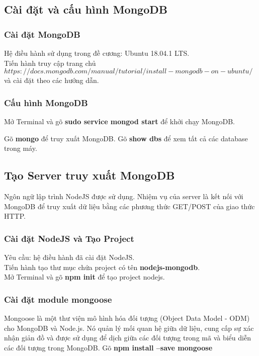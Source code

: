 \subsection{Cài đặt và cấu hình MongoDB}
\subsubsection{Cài đặt MongoDB}
Hệ điều hành sử dụng trong đề cương: Ubuntu 18.04.1 LTS.\\
Tiến hành truy cập trang chủ $https://docs.mongodb.com/manual/tutorial/install-mongodb-on-ubuntu/$ và cài đặt theo các hướng dẫn.
\label{ref{fig4_1}}
\subsubsection{Cấu hình MongoDB}
Mở Terminal và gõ \textbf{sudo service mongod start} để khởi chạy MongoDB.\\
\label{ref{fig4_2}}

Gõ \textbf{mongo} để truy xuất MongoDB.
\label{ref{fig4_3}}
Gõ \textbf{show dbs} để xem tất cả các database trong máy.
\label{ref{fig4_4}}

\subsection{Tạo Server truy xuất MongoDB}
Ngôn ngữ lập trình NodeJS được sử dụng. Nhiệm vụ của server là kết nối với MongoDB để truy xuất dữ liệu bằng các phương thức GET/POST của giao thức HTTP.

\subsubsection{Cài đặt NodeJS và Tạo Project}
Yêu cầu: hệ điều hành đã cài đặt NodeJS.\\
Tiến hành tạo thư mục chứa project có tên \textbf{nodejs-mongodb}.\\
Mở Terminal và gõ \textbf{npm init} để tạo project nodejs.\\
\label{ref{fig4_5}}

\subsubsection{Cài đặt module mongoose}
Mongoose là một thư viện mô hình hóa đối tượng (Object Data Model - ODM) cho MongoDB và Node.js. Nó quản lý mối quan hệ giữa dữ liệu, cung cấp sự xác nhận giản đồ và được sử dụng để dịch giữa các đối tượng trong mã và biểu diễn các đối tượng trong MongoDB.
\label{ref{fig4_6_1}}
Gõ \textbf{npm install --save mongoose}
\label{ref{fig4_6}}

